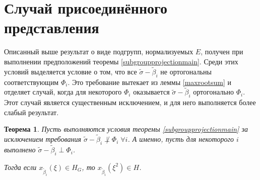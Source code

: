 \documentclass[12pt]{matmex-diploma}
\theoremstyle{mystyleni}
\theoremstyle{mystyle}
\newtheorem{thm}{Теорема}
\newcommand\refb[1]{\ref{#1}}
\begin{document}
\section{Случай присоединённого представления}

Описанный выше результат о виде подгрупп, нормализуемых $E$, получен при выполнении предположений теоремы \refb{subgroupprojectionmain}. Среди этих условий выделяется условие о том, что все $\widetilde\sigma-\widetilde\beta_i$ не ортогональны соответствующим $\Phi_i$. Это требование вытекает из леммы \refb{maxrootsum} и отделяет случай, когда для некоторого $\Phi_i$ оказывается $\widetilde\sigma-\widetilde\beta_i$ ортогонально $\Phi_i$. Этот случай является существенным исключением, и для него выполняется более слабый результат.

\begin{thm}
Пусть выполняются условия теоремы \refb{subgroupprojectionmain} за исключением требования $\widetilde\sigma-\widetilde\beta_i \not\perp \Phi_i \; \forall i$. А именно, пусть для некоторого $i$ выполнено $\widetilde\sigma-\widetilde\beta_i \perp \Phi_i$.

Тогда если $x_{\widetilde\beta_i}(\xi) \in H_G$, то $x_{\widetilde\beta_i}(\xi^2) \in H$.
\end{thm}
\end{document}
